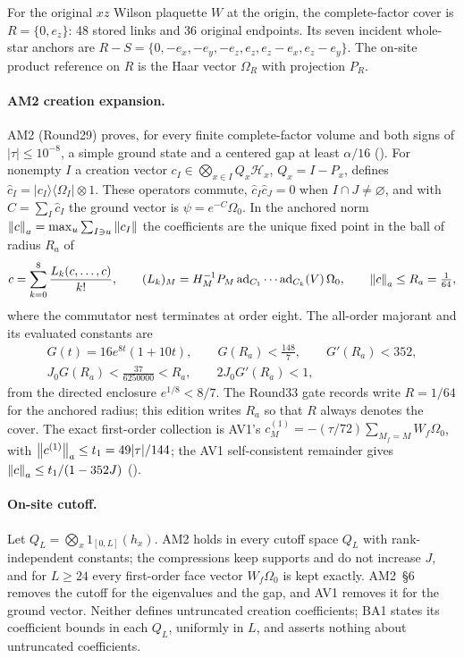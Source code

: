 For the original $xz$ Wilson plaquette $W$ at the origin, the complete-factor
cover is $R=\{0,e_z\}$: 48 stored links and 36 original endpoints. Its seven
incident whole-star anchors are
$R-S=\{0,-e_x,-e_y,-e_z,e_z,e_z-e_x,e_z-e_y\}$. The on-site product reference
on $R$ is the Haar vector $\Omega_R$ with projection $P_R$.

\paragraph{AM2 creation expansion.}
AM2 (Round29) proves, for every finite complete-factor volume and both signs of
$|\tau|\le10^{-8}$, a simple ground state and a centered gap at least
$\alpha/16$ (). For
nonempty $I$ a creation vector $c_I\in\bigotimes_{x\in I}Q_x\mathcal H_x$,
$Q_x=I-P_x$, defines $\hat c_I=|c_I\rangle\langle\Omega_I|\otimes1$. These
operators commute, $\hat c_I\hat c_J=0$ when $I\cap J\ne\varnothing$, and with
$C=\sum_I\hat c_I$ the ground vector is $\psi=e^{-C}\Omega_0$. In the anchored
norm $\left\lVert c\right\rVert_a=\max_u\sum_{I\ni u}\left\lVert c_I\right\rVert$ the coefficients are the
unique fixed point in the ball of radius $R_a$ of
\begin{equation}
 c=\sum_{k=0}^{8}\frac{L_k(c,\ldots,c)}{k!},\qquad
 (L_k)_M=H_M^{-1}P_M\,\mathrm{ad}_{C_1}\cdots\mathrm{ad}_{C_k}(V)\,\Omega_0,\qquad
 \left\lVert c\right\rVert_a\le R_a=\tfrac1{64},
 \label{eq:dict-fixed}
\end{equation}
where the commutator nest terminates at order eight. The all-order majorant
and its evaluated constants are
\begin{equation}
 \begin{gathered}
 G(t)=16e^{8t}(1+10t),\qquad G(R_a)<\tfrac{148}{7},\qquad G'(R_a)<352,\\
 J_0G(R_a)<\tfrac{37}{6250000}<R_a,\qquad 2J_0G'(R_a)<1 ,
 \end{gathered}
 \label{eq:dict-majorant}
\end{equation}
from the directed enclosure $e^{1/8}<8/7$. The Round33 gate records write
$R=1/64$ for the anchored radius; this edition writes $R_a$ so that $R$
always denotes the cover. The exact first-order collection is AV1's
$c^{(1)}_M=-(\tau/72)\sum_{M_f=M}W_f\Omega_0$, with
$\left\lVert c^{(1)}\right\rVert_a\le t_1=49|\tau|/144$; the AV1 self-consistent remainder gives
$\left\lVert c\right\rVert_a\le t_1/(1-352J)$
().

\paragraph{On-site cutoff.}
Let $Q_L=\bigotimes_x1_{[0,L]}(h_x)$. AM2 holds in every cutoff space $Q_L$
with rank-independent constants; the compressions keep supports and do not
increase $J$, and for $L\ge24$ every first-order face vector $W_f\Omega_0$ is
kept exactly. AM2~\S6 removes the cutoff for the eigenvalues and the gap, and
AV1 removes it for the ground vector. Neither defines untruncated creation
coefficients; BA1 states its coefficient bounds in each $Q_L$, uniformly in
$L$, and asserts nothing about untruncated coefficients.

